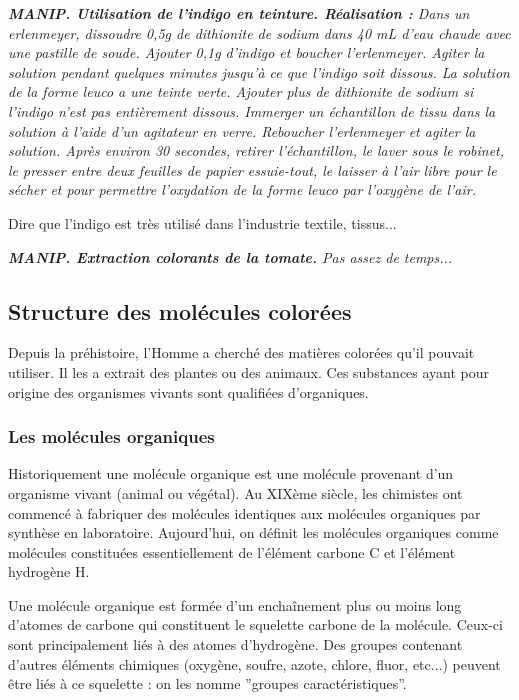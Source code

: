 \documentclass{article}
\begin{document}
\textit{\textbf{MANIP. Utilisation de l'indigo en teinture. Réalisation :} Dans un erlenmeyer, dissoudre 0,5g de dithionite de sodium dans 40 mL d'eau chaude avec une pastille de soude. Ajouter 0,1g d'indigo et boucher l'erlenmeyer. Agiter la solution pendant quelques minutes jusqu'à ce que l'indigo soit dissous. La solution de la forme leuco a une teinte verte. Ajouter plus de dithionite de sodium si l'indigo n'est pas entièrement dissous. Immerger un échantillon de tissu dans la solution à l'aide d'un agitateur en verre. Reboucher l'erlenmeyer et agiter la solution. Après environ 30 secondes, retirer l'échantillon, le laver sous le robinet, le presser entre deux feuilles de papier essuie-tout, le laisser à l'air libre pour le sécher et pour permettre l'oxydation de la forme leuco par l'oxygène de l'air.}\medskip

Dire que l'indigo est très utilisé dans l'industrie textile, tissus...\medskip

\textit{\textbf{MANIP. Extraction colorants de la tomate.} Pas assez de temps...}

\subsection{Structure des molécules colorées}
Depuis la préhistoire, l'Homme a cherché des matières colorées qu'il pouvait utiliser. Il les a extrait des plantes ou des animaux. Ces substances ayant pour origine des organismes vivants sont qualifiées d'organiques.

\subsubsection{Les molécules organiques}
Historiquement une molécule organique est une molécule provenant d’un organisme vivant (animal ou végétal). Au XIXème siècle, les chimistes ont commencé à fabriquer des molécules identiques aux molécules organiques par synthèse en laboratoire. Aujourd’hui, on définit les molécules organiques comme molécules constituées essentiellement de l’élément carbone C et l’élément hydrogène H. \medskip

Une molécule organique est formée d’un enchaînement plus ou moins long d’atomes de carbone qui constituent le squelette carbone de la molécule. Ceux-ci sont principalement liés à des atomes d’hydrogène. Des groupes contenant d’autres éléments chimiques (oxygène, soufre, azote, chlore, fluor, etc...) peuvent être liés à ce squelette : on les nomme ”groupes
caractéristiques”. \medskip
 
\end{document}
